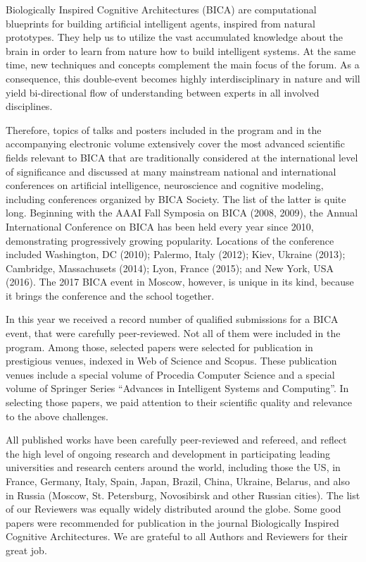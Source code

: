 \documentclass[10pt,fleqn,openany]{book} %
\begin{document}
Biologically Inspired Cognitive Architectures (BICA) are computational blueprints for building artificial intelligent agents, inspired from natural prototypes. They help us to utilize the vast accumulated knowledge about the brain in order to learn from nature how to build intelligent systems. At the same time, new techniques and concepts complement the main focus of the forum. As a consequence, this double-event becomes highly interdisciplinary in nature and will yield bi-directional flow of understanding between experts in all involved disciplines.

Therefore, topics of talks and posters included in the program and in the accompanying electronic volume extensively cover the most advanced scientific fields relevant to BICA that are traditionally considered at the international level of significance and discussed at many mainstream national and international conferences on artificial intelligence, neuroscience and cognitive modeling, including conferences organized by BICA Society. The list of the latter is quite long. Beginning with the AAAI Fall Symposia on BICA (2008, 2009), the Annual International Conference on BICA has been held every year since 2010, demonstrating progressively growing popularity. Locations of the conference included Washington, DC (2010); Palermo, Italy (2012); Kiev, Ukraine (2013); Cambridge, Massachusets (2014); Lyon, France (2015); and New York, USA (2016). The 2017 BICA event in Moscow, however, is unique in its kind, because it brings the conference and the school together.

In this year we received a record number of qualified submissions for a BICA event, that were carefully peer-reviewed. Not all of them were included in the program. Among those, selected papers were selected for publication in prestigious venues, indexed in Web of Science and Scopus. These publication venues include a special volume of Procedia Computer Science and a special volume of Springer Series “Advances in Intelligent Systems and Computing”. In selecting those papers, we paid attention to their scientific quality and relevance to the above challenges. 

All published works have been carefully peer-reviewed and refereed, and reflect the high level of ongoing research and development in participating leading universities and research centers around the world, including those the US, in France, Germany, Italy, Spain, Japan, Brazil, China, Ukraine, Belarus, and also in Russia (Moscow, St. Petersburg, Novosibirsk and other Russian cities). The list of our Reviewers was equally widely distributed around the globe. Some good papers were recommended for publication in the journal Biologically Inspired Cognitive Architectures. We are grateful to all Authors and Reviewers for their great job.
\end{document}
